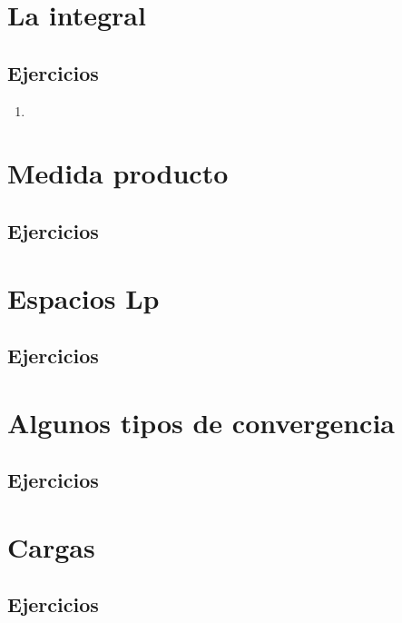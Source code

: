 \documentclass[spanish,12pt,a4paper,openany]{book}
\begin{document}
	\chapter{La integral}
	\section{Ejercicios} \label{Ejercicios 3}
		\begin{enumerate}
			\item 
		\end{enumerate}
	\chapter{Medida producto}
	\section{Ejercicios}
	\chapter{Espacios Lp}
	\section{Ejercicios}
	\chapter{Algunos tipos de convergencia}
	\section{Ejercicios}
	\chapter{Cargas}
	\section{Ejercicios}
	
\end{document}
